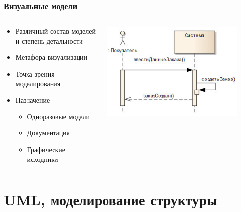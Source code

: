 \documentclass[xetex,mathserif,serif]{beamer}
\begin{document}
	\begin{frame}
		\frametitle{Визуальные модели}
		\begin{columns}
			\begin{column}{0.5\textwidth}
				\begin{itemize}
					\item Различный состав моделей и степень детальности
					\item Метафора визуализации
					\item Точка зрения моделирования
					\item Назначение
					\begin{itemize}
						\item Одноразовые модели
						\item Документация
						\item Графические исходники
					\end{itemize}
				\end{itemize}
			\end{column}
			\begin{column}{0.5\textwidth}
				\begin{center}
					\includegraphics[width=0.9\textwidth]{modelExample.png}
				\end{center}
			\end{column}
		\end{columns}
	\end{frame}

	\section{UML, моделирование структуры}
\end{document}
